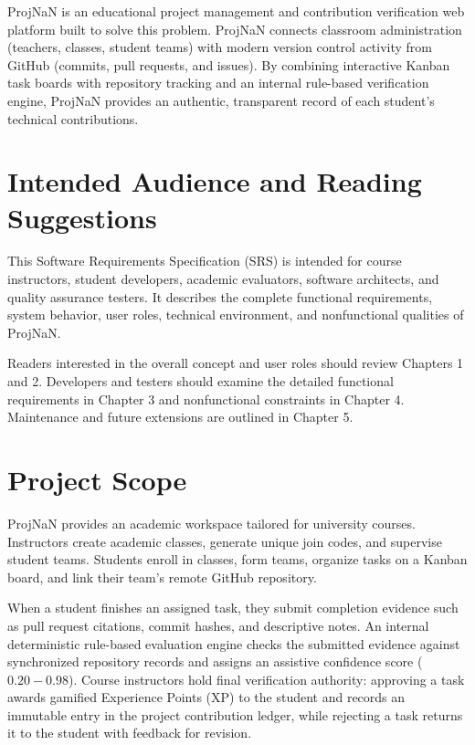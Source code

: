 \documentclass{scrreprt}
\begin{document}
ProjNaN is an educational project management and contribution verification web platform built to solve this problem. ProjNaN connects classroom administration (teachers, classes, student teams) with modern version control activity from GitHub (commits, pull requests, and issues). By combining interactive Kanban task boards with repository tracking and an internal rule-based verification engine, ProjNaN provides an authentic, transparent record of each student's technical contributions.

\section{Intended Audience and Reading Suggestions}\label{sec:audience}
This Software Requirements Specification (SRS) is intended for course instructors, student developers, academic evaluators, software architects, and quality assurance testers. It describes the complete functional requirements, system behavior, user roles, technical environment, and nonfunctional qualities of ProjNaN.

Readers interested in the overall concept and user roles should review Chapters 1 and 2. Developers and testers should examine the detailed functional requirements in Chapter 3 and nonfunctional constraints in Chapter 4. Maintenance and future extensions are outlined in Chapter 5.

\section{Project Scope}\label{sec:scope}
ProjNaN provides an academic workspace tailored for university courses. Instructors create academic classes, generate unique join codes, and supervise student teams. Students enroll in classes, form teams, organize tasks on a Kanban board, and link their team's remote GitHub repository.

When a student finishes an assigned task, they submit completion evidence such as pull request citations, commit hashes, and descriptive notes. An internal deterministic rule-based evaluation engine checks the submitted evidence against synchronized repository records and assigns an assistive confidence score ($0.20 - 0.98$). Course instructors hold final verification authority: approving a task awards gamified Experience Points (XP) to the student and records an immutable entry in the project contribution ledger, while rejecting a task returns it to the student with feedback for revision.
\end{document}
